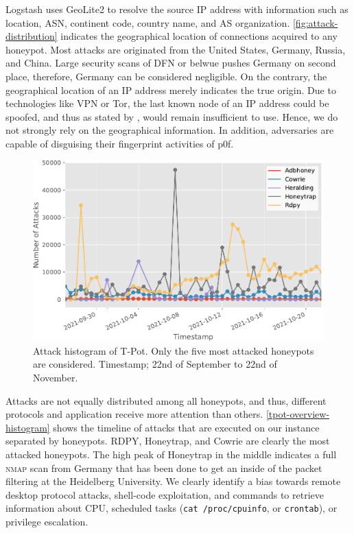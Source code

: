 Logstash uses GeoLite2 to resolve the source IP address with information such as location, ASN, continent code, country name, and AS organization.
\autoref{fig:attack-distribution} indicates the geographical location of connections acquired to any honeypot.
Most attacks are originated from the United States, Germany, Russia, and China.
Large security scans of DFN or \ac{belwue} pushes Germany on second place, therefore, Germany can be considered negligible.
On the contrary, the geographical location of an IP address merely indicates the true origin. 
Due to technologies like VPN or Tor, the last known node of an IP address could be spoofed, and thus as stated by \citet{Kelly2021}, would remain insufficient to use.
Hence, we do not strongly rely on the geographical information.
In addition, adversaries are capable of disguising their fingerprint activities of p0f.

\begin{figure}[ht]
    \centering
    \includegraphics[width=\textwidth]{figures/tpot-attacks-histogram.pdf}
    \caption[Attack histogram of T-Pot]{Attack histogram of T-Pot. Only the five most attacked honeypots are considered. Timestamp; 22nd of September to 22nd of November.}
    \label{tpot-overview-histogram}
\end{figure}

Attacks are not equally distributed among all honeypots, and thus, different protocols and application receive more attention than others.
\autoref{tpot-overview-histogram} shows the timeline of attacks that are executed on our instance separated by honeypots.
RDPY, Honeytrap, and Cowrie are clearly the most attacked honeypots.
The high peak of Honeytrap in the middle indicates a full \textsc{nmap} scan from Germany that has been done to get an inside of the packet filtering at the Heidelberg University.
We clearly identify a bias towards remote desktop protocol attacks, shell-code exploitation, and commands to retrieve information about CPU, scheduled tasks (\verb|cat /proc/cpuinfo|, or \verb|crontab|), or privilege escalation.

